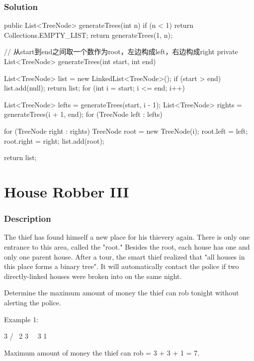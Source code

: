 \subsubsection{Solution}

\begin{Code}
public List<TreeNode> generateTrees(int n) {
    if (n < 1) {
        return Collections.EMPTY_LIST;
    }
    return generateTrees(1, n);
}

// 从start到end之间取一个数作为root，左边构成left，右边构成right
private List<TreeNode> generateTrees(int start, int end) {
    List<TreeNode> list = new LinkedList<TreeNode>();
    if (start > end) {
        list.add(null);
        return list;
    }
    for (int i = start; i <= end; i++) {
        List<TreeNode> lefts = generateTrees(start, i - 1);
        List<TreeNode> rights = generateTrees(i + 1, end);
        for (TreeNode left : lefts) {
            for (TreeNode right : rights) {
                TreeNode root = new TreeNode(i);
                root.left = left;
                root.right = right;
                list.add(root);
            }

        }
    }
    return list;
}
\end{Code}

\newpage

\section{House Robber III} %

\subsubsection{Description}
The thief has found himself a new place for his thievery again. There is only one entrance to this area, called the "root." Besides the root, each house has one and only one parent house. After a tour, the smart thief realized that "all houses in this place forms a binary tree". It will automatically contact the police if two directly-linked houses were broken into on the same night.

Determine the maximum amount of money the thief can rob tonight without alerting the police.

Example 1:
\begin{Code}
     3
    / \
   2   3
    \   \
     3   1
\end{Code}

Maximum amount of money the thief can rob = 3 + 3 + 1 = 7.

